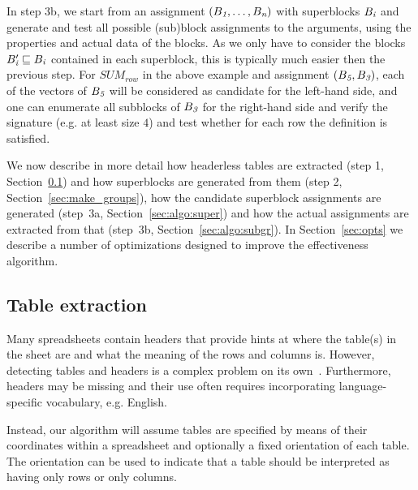 In step 3b, we start from an assignment $(B_{\textit{1}}, \ldots, B_{\textit{n}})$ with superblocks $B_{\textit{i}}$ and generate and test all possible (sub)block assignments to the arguments, using the properties and actual data of the blocks. As we only have to consider the blocks $B'_{\textit{i}} \sqsubseteq B_{\textit{i}}$ contained in each superblock, this is typically much easier then the previous step. For $\textit{SUM}_{row}$ in the above example and assignment $(B_{\textit{5}}, B_{\textit{3}})$, each of the vectors of $B_{\textit{5}}$ will be considered as candidate for the left-hand side, and one can enumerate all subblocks of $B_{\textit{3}}$ for the right-hand side and verify the signature (e.g. at least size $4$) and test whether for each row the definition is satisfied. %

We now describe in more detail how headerless tables are extracted (step 1, Section~\ref{sec:table_extraction}) and how superblocks are generated from them (step 2, Section~\ref{sec:make_groups}), how the candidate superblock assignments are generated (step~3a, Section~\ref{sec:algo:super}) and how the actual assignments are extracted from that (step~3b, Section~\ref{sec:algo:subgr}).
In Section~\ref{sec:opts} we describe a number of optimizations designed to improve the effectiveness algorithm.





\subsection{Table extraction}
\label{sec:table_extraction}
Many spreadsheets contain headers that provide hints at where the table(s) in the sheet are and what the meaning of the rows and columns is. However, detecting tables and headers is a complex problem on its own~\cite{header}. Furthermore, headers may be missing and their use often requires incorporating language-specific vocabulary, e.g. English.


Instead, our algorithm will assume tables are specified by means of their coordinates within a spreadsheet and optionally a fixed orientation of each table. The orientation can be used to indicate that a table should be interpreted as having only rows or only columns.

